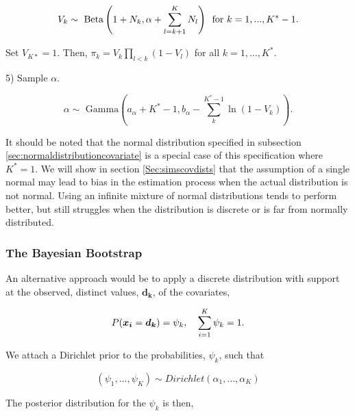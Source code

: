\documentclass[
  12pt,
]{article}
\begin{document}
\begin{list}{}{}
\begin{equation}
 V_k \sim \text{ Beta}\left(1+N_k, \alpha+\sum_{l=k+1}^K N_l\right) \hspace{5px} \text{for } k=1,...,K^*-1.
\end{equation}

Set $V_{K*}=1$.  Then, $\pi_k = V_k\prod_{l<k}(1-V_l)$ for all $k=1,...,K^*$.

\item[5)] Sample $\alpha$.

\begin{equation}
  \alpha \sim \text{ Gamma}\left(a_\alpha + K^* -1, b_\alpha - \sum_{k}^{K^*-1}\ln(1-V_k) \right).
\end{equation}

\end{list}

It should be noted that the normal distribution specified in subsection
\ref{sec:normaldistributioncovariate} is a special case of this
specification where \(K^*=1\). We will show in section
\ref{Sec:simscovdists} that the assumption of a single normal may lead
to bias in the estimation process when the actual distribution is not
normal. Using an infinite mixture of normal distributions tends to
perform better, but still struggles when the distribution is discrete or
is far from normally distributed.

\subsubsection{The Bayesian Bootstrap}

\vspace{-10px}

An alternative approach would be to apply a discrete distribution with
support at the observed, distinct values, \(\boldsymbol{d_k}\), of the
covariates,

\begin{equation}
P(\boldsymbol{x_i}=\boldsymbol{d_k}) = \psi_k, \hspace{10px} \sum_{i=1}^K \psi_k = 1.
\end{equation}

We attach a Dirichlet prior to the probabilities, \(\psi_k\), such that

\begin{equation}
(\psi_1, ..., \psi_K) \sim Dirichlet(\alpha_1,...,\alpha_K)
\end{equation}

The posterior distribution for the \(\psi_k\) is then,
\end{document}
